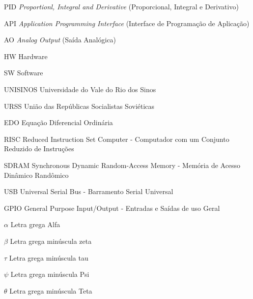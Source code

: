 \listoffigures*
\cleardoublepage
\listoftables*
\cleardoublepage
\begin{siglas}
\item[PID] \textit{Proportionl, Integral and Derivative} (Proporcional, Integral e Derivativo)
\item[API] \textit{Application Programming Interface} (Interface de Programação de Aplicação)
\item[AO] \textit{Analog Output} (Saída Analógica)
\item[HW] Hardware
\item[SW] Software
\item[UNISINOS] Universidade do Vale do Rio dos Sinos
\item[URSS] União das Repúblicas Socialistas Soviéticas
\item[EDO] Equação Diferencial Ordinária
\item[RISC] Reduced Instruction Set Computer - Computador com um Conjunto Reduzido de Instruções
\item[SDRAM] Synchronous Dynamic Random-Access Memory - Memória de Acesso Dinâmico Randômico
\item[USB]  Universal Serial Bus - Barramento Serial Universal
\item[GPIO] General Purpose Input/Output - Entradas e Saídas de uso Geral

\end{siglas}
\begin{simbolos}
  \item[$ \alpha $] Letra grega Alfa
  \item[$ \beta $] Letra grega minúscula zeta
  \item[$ \tau $] Letra grega minúscula tau
  \item[$ \psi $] Letra grega minúscula Psi
  \item[$ \theta $] Letra grega minúscula Teta
\end{simbolos}